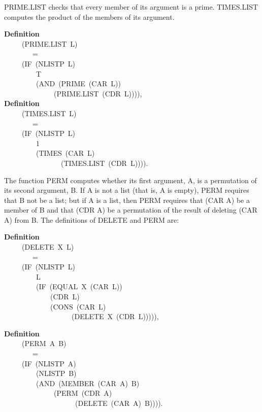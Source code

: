 \documentclass[10pt]{book}
\newenvironment{pubasis}{\begin{flushleft}}{\end{flushleft}}
\newcommand{\axiomordefinition}[1]{\vspace{6pt}\Large\textsf{\textbf{#1}}\normalsize}
\begin{document}
PRIME.LIST checks that every member of its argument
is a prime.  TIMES.LIST computes the product of the members of 
its argument.
\begin{pubasis}
\axiomordefinition{Definition}\\
~~~~~(PRIME.LIST~L)\\
~~~~~~~~=\\
~~~~~(IF~(NLISTP~L)\\
~~~~~~~~~T\\
~~~~~~~~~(AND~(PRIME~(CAR~L))\\
~~~~~~~~~~~~~~(PRIME.LIST~(CDR~L)))),\\

\axiomordefinition{Definition}\\
~~~~~(TIMES.LIST~L)\\
~~~~~~~~=\\
~~~~~(IF~(NLISTP~L)\\
~~~~~~~~~1\\
~~~~~~~~~(TIMES~(CAR~L)\\
~~~~~~~~~~~~~~~~(TIMES.LIST~(CDR~L)))).\\
\end{pubasis}
The function PERM computes whether its first argument, A, is
a permutation of its second argument, B.  If A is
not a list (that is, A is empty),  PERM
requires that   B not be  a list; but if 
A is a list, then PERM requires that (CAR A)
be a member of B and that (CDR A) be a permutation of
the result of deleting (CAR A) from B.
The definitions of DELETE and PERM are:
\begin{pubasis}
\axiomordefinition{Definition}\\
~~~~~(DELETE~X~L)\\
~~~~~~~~=\\
~~~~~(IF~(NLISTP~L)\\
~~~~~~~~~L\\
~~~~~~~~~(IF~(EQUAL~X~(CAR~L))\\
~~~~~~~~~~~~~(CDR~L)\\
~~~~~~~~~~~~~(CONS~(CAR~L)\\
~~~~~~~~~~~~~~~~~~~(DELETE~X~(CDR~L))))),\\
\end{pubasis}
\begin{pubasis}
\axiomordefinition{Definition}\\
~~~~~(PERM~A~B)\\
~~~~~~~~=\\
~~~~~(IF~(NLISTP~A)\\
~~~~~~~~~(NLISTP~B)\\
~~~~~~~~~(AND~(MEMBER~(CAR~A)~B)\\
~~~~~~~~~~~~~~(PERM~(CDR~A)\\
~~~~~~~~~~~~~~~~~~~~(DELETE~(CAR~A)~B)))).\\
\end{pubasis}
\end{document}
